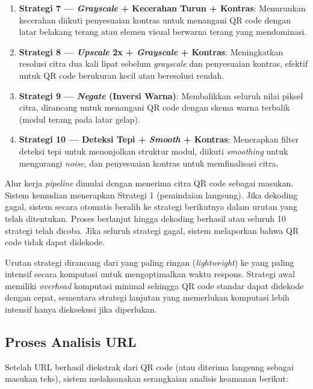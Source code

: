 \documentclass[conference]{IEEEtran}
\begin{document}
\begin{enumerate}[label=\arabic*)]
    \item \textbf{Strategi 7 --- \textit{Grayscale} + Kecerahan Turun + Kontras}: Menurunkan kecerahan diikuti penyesuaian kontras untuk menangani QR code dengan latar belakang terang atau elemen visual berwarna terang yang mendominasi.
    
    \item \textbf{Strategi 8 --- \textit{Upscale} 2x + \textit{Grayscale} + Kontras}: Meningkatkan resolusi citra dua kali lipat sebelum \textit{grayscale} dan penyesuaian kontras, efektif untuk QR code berukuran kecil atau beresolusi rendah.
    
    \item \textbf{Strategi 9 --- \textit{Negate} (Inversi Warna)}: Membalikkan seluruh nilai piksel citra, dirancang untuk menangani QR code dengan skema warna terbalik (modul terang pada latar gelap).
    
    \item \textbf{Strategi 10 --- Deteksi Tepi + \textit{Smooth} + Kontras}: Menerapkan filter deteksi tepi untuk menonjolkan struktur modul, diikuti \textit{smoothing} untuk mengurangi \textit{noise}, dan penyesuaian kontras untuk memfinalisasi citra.
\end{enumerate}

Alur kerja \textit{pipeline} dimulai dengan menerima citra QR code sebagai masukan. Sistem kemudian menerapkan Strategi 1 (pemindaian langsung). Jika dekoding gagal, sistem secara otomatis beralih ke strategi berikutnya dalam urutan yang telah ditentukan. Proses berlanjut hingga dekoding berhasil atau seluruh 10 strategi telah dicoba. Jika seluruh strategi gagal, sistem melaporkan bahwa QR code tidak dapat didekode.

Urutan strategi dirancang dari yang paling ringan (\textit{lightweight}) ke yang paling intensif secara komputasi untuk mengoptimalkan waktu respons. Strategi awal memiliki \textit{overhead} komputasi minimal sehingga QR code standar dapat didekode dengan cepat, sementara strategi lanjutan yang memerlukan komputasi lebih intensif hanya dieksekusi jika diperlukan.

\subsection{Proses Analisis URL}

Setelah URL berhasil diekstrak dari QR code (atau diterima langsung sebagai masukan teks), sistem melaksanakan serangkaian analisis keamanan berikut:
\end{document}

